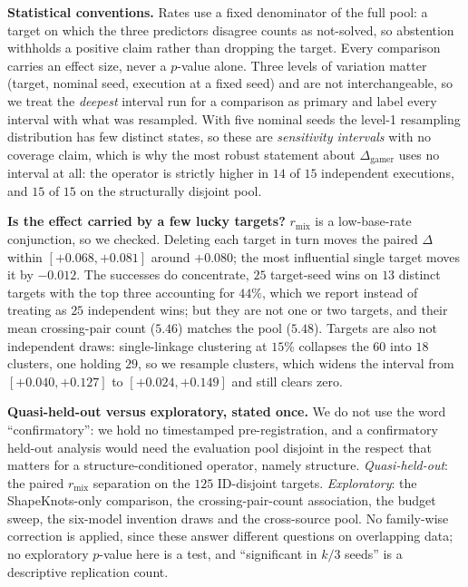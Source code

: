 \documentclass[11pt]{article}
\begin{document}
\smallskip\noindent\textbf{Statistical conventions.} Rates use a fixed denominator of the full pool: a target
on which the three predictors disagree counts as not-solved, so abstention withholds a positive claim rather
than dropping the target. Every comparison carries an effect size, never a $p$-value alone. Three levels of
variation matter (target, nominal seed, execution at a fixed seed) and are not interchangeable, so we treat the
\emph{deepest} interval run for a comparison as primary and label every interval with what was resampled. With
five nominal seeds the level-1 resampling distribution has few distinct states, so these are \emph{sensitivity
intervals} with no coverage claim, which is why the most robust statement about $\Delta_{\mathrm{gamer}}$ uses
no interval at all: the operator is strictly higher in $14$ of $15$ independent executions, and $15$ of $15$ on
the structurally disjoint pool.

\smallskip\noindent\textbf{Is the effect carried by a few lucky targets?} $r_{\mathrm{mix}}$ is a low-base-rate
conjunction, so we checked. Deleting each target in turn moves the paired $\Delta$ within
$[{+}0.068,{+}0.081]$ around ${+}0.080$; the most influential single target moves it by $-0.012$. The successes
do concentrate, $25$ target-seed wins on $13$ distinct targets with the top three accounting for $44\%$, which we report instead of treating as $25$ independent wins; but they are not one or two targets, and their mean
crossing-pair count ($5.46$) matches the pool ($5.48$). Targets are also not independent draws: single-linkage
clustering at $15\%$ collapses the $60$ into $18$ clusters, one holding $29$, so we resample clusters, which
widens the interval from $[{+}0.040,{+}0.127]$ to $[{+}0.024,{+}0.149]$ and still clears zero.

\smallskip\noindent\textbf{Quasi-held-out versus exploratory, stated once.} We do not use the word
``confirmatory'': we hold no timestamped pre-registration, and a confirmatory held-out analysis would need the
evaluation pool disjoint in the respect that matters for a structure-conditioned operator, namely structure.
\emph{Quasi-held-out}: the paired $r_{\mathrm{mix}}$ separation on the $125$ ID-disjoint targets.
\emph{Exploratory}: the ShapeKnots-only comparison, the crossing-pair-count association, the budget sweep, the
six-model invention draws and the cross-source pool. No family-wise correction is applied, since these answer
different questions on overlapping data; no exploratory $p$-value here is a test, and ``significant in $k/3$
seeds'' is a descriptive replication count.
\end{document}
